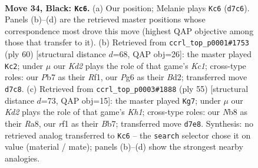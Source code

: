 \documentclass[11pt]{article}
\begin{document}
\clearpage

\begin{figure}[p]\centering
\begin{subfigure}{0.46\textwidth}\centering
\resizebox{\linewidth}{!}{%
\newchessgame
\chessboard[
  setfen={rn1b2r1/1p1k1b1p/6pP/p1NpPp2/P7/2N3P1/1B4K1/R4R2 b - - 12 34},
  showmover=false,
  pgfstyle=straightmove, color=movearrow, markmove={d7-c6}
]}
\caption{}
\end{subfigure}\hfill
\begin{subfigure}{0.46\textwidth}\centering
\resizebox{\linewidth}{!}{%
\newchessgame
\chessboard[
  setfen={2r4b/2r1pk1p/3pp2P/NB2n3/P3P1Pp/1PP2P2/3B4/2K2R2 w - - 1 31},
  showmover=false,
  pgfstyle=straightmove, color=movearrow, markmove={c1-c2}
]}
\caption{}
\end{subfigure}
\\[4pt]
\begin{subfigure}{0.46\textwidth}\centering
\resizebox{\linewidth}{!}{%
\newchessgame
\chessboard[
  setfen={r4b1k/1b1r4/p2p2pp/1p1Pp3/4N1PP/1P2B3/1P3PK1/2RR4 b - - 0 28},
  showmover=false,
  pgfstyle=straightmove, color=movearrow, markmove={h8-g7}
]}
\caption{}
\end{subfigure}\hfill

\caption{\textbf{Move 34, Black: \texttt{Kc6}.} (a) Our position; Melanie plays \texttt{Kc6} (\texttt{d7c6}). Panels (b)--(d) are the retrieved master positions whose correspondence most drove this move (highest QAP objective among those that transfer to it). (b) Retrieved from \texttt{ccrl\_top\_p0001\#1753} (ply 60) [structural distance $d$=68, QAP obj=26]: the master played \texttt{Kc2}; under $\mu$ our \emph{Kd2} plays the role of that game's \emph{Kc1}; cross-type roles: our \emph{P}b7 as their \emph{R}f1, our \emph{P}g6 as their \emph{B}d2; transferred move \texttt{d7c8}. (c) Retrieved from \texttt{ccrl\_top\_p0003\#1888} (ply 55) [structural distance $d$=73, QAP obj=15]: the master played \texttt{Kg7}; under $\mu$ our \emph{Kd2} plays the role of that game's \emph{Kh1}; cross-type roles: our \emph{N}b8 as their \emph{R}a8, our \emph{r}f1 as their \emph{B}b7; transferred move \texttt{d7e8}. Synthesis: no retrieved analog transferred to \texttt{Kc6} -- the \texttt{search} selector chose it on value (material / mate); panels (b)--(d) show the strongest nearby analogies.}
\label{fig:thought-m67}
\end{figure}

\clearpage
\end{document}
